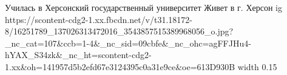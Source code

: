  
 
 
 
 

\par
Училась в Херсонский государственный университет
Живет в г. Херсон
\ifcmt
  ig https://scontent-cdg2-1.xx.fbcdn.net/v/t31.18172-8/16251789_137026313472016_3543857515389968056_o.jpg?_nc_cat=107&ccb=1-4&_nc_sid=09cbfe&_nc_ohc=agFFJHu4-hYAX_S34zk&_nc_ht=scontent-cdg2-1.xx&oh=141957d5b2efd67e3124395c0a31e9ce&oe=613D930B
  width 0.15
\fi

